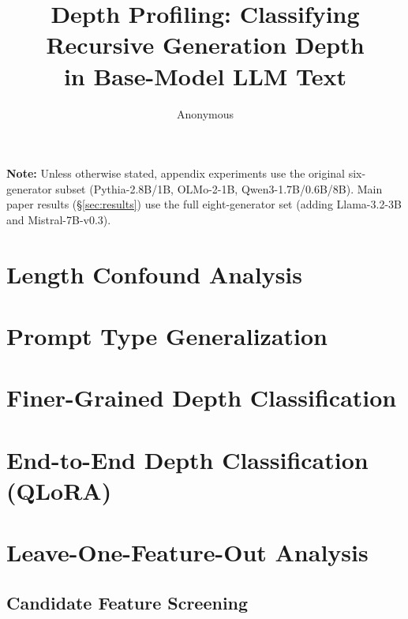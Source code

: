 \documentclass[11pt]{article}
\title{Depth Profiling: Classifying Recursive Generation Depth\\in Base-Model LLM Text}
\author{Anonymous}
\begin{document}
\maketitle














\appendix
\renewcommand{\thesection}{\alphalph{\value{section}}}

\noindent\textbf{Note:} Unless otherwise stated, appendix experiments use the original six-generator subset (Pythia-2.8B/1B, OLMo-2-1B, Qwen3-1.7B/0.6B/8B).
Main paper results (\S\ref{sec:results}) use the full eight-generator set (adding Llama-3.2-3B and Mistral-7B-v0.3).



\section{Length Confound Analysis}
\label{app:length}


\section{Prompt Type Generalization}
\label{app:prompt-type}

\FloatBarrier

\section{Finer-Grained Depth Classification}
\label{app:finer-depth}

\FloatBarrier

\section{End-to-End Depth Classification (QLoRA)}
\label{app:qlora}

\FloatBarrier

\section{Leave-One-Feature-Out Analysis}
\label{app:lofo}

\FloatBarrier

\subsection{Candidate Feature Screening}
\label{app:feature-candidate}

\FloatBarrier
\end{document}
